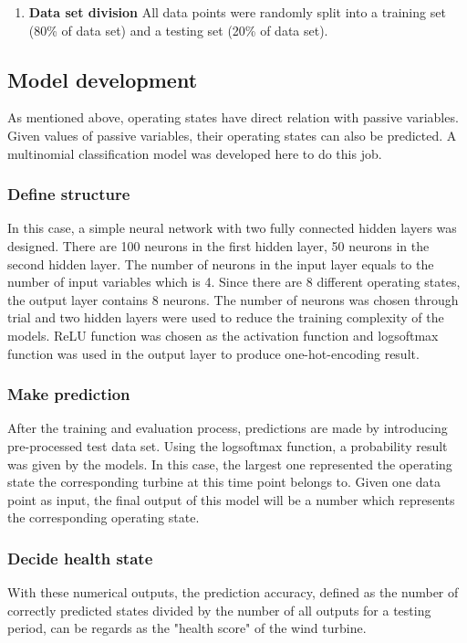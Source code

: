 \begin{enumerate}
\item \textbf{Data set division}
All data points were randomly split into a training set (80\% of data set) and a testing set (20\% of data set).

\end{enumerate}

\subsection{Model development}
As mentioned above, operating states have direct relation with passive variables. Given values of passive variables, their operating states can also be predicted. A multinomial classification model was developed here to do this job.

\subsubsection{Define structure}
In this case, a simple neural network with two fully connected hidden layers was designed. There are 100 neurons in the first hidden layer, 50 neurons in the second hidden layer. The number of neurons in the input layer equals to the number of input variables which is 4. Since there are 8 different operating states, the output layer contains 8 neurons. The number of neurons was chosen through trial and two hidden layers were used to reduce the training complexity of the models. ReLU function was chosen as the activation function and logsoftmax function was used in the output layer to produce one-hot-encoding result.

\subsubsection{Make prediction}
After the training and evaluation process, predictions are made by introducing pre-processed test data set. Using the logsoftmax function, a probability result was given by the models. In this case, the largest one represented the operating state the corresponding turbine at this time point belongs to. Given one data point as input, the final output of this model will be a number which represents the corresponding operating state.

\subsubsection{Decide health state}
With these numerical outputs, the prediction accuracy, defined as the number of correctly predicted states divided by the number of all outputs for a testing period, can be regards as the "health score" of the wind turbine.

